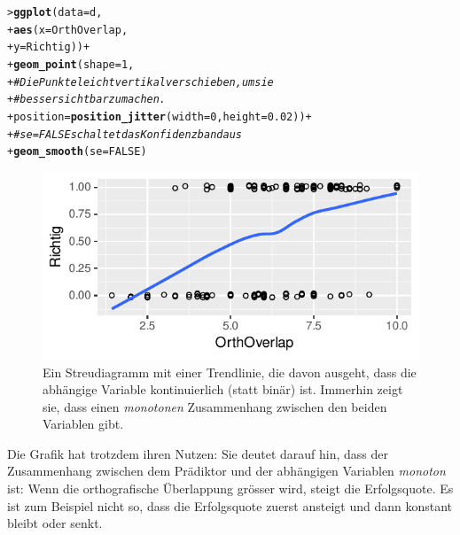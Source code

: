 \documentclass[oneside, 10pt]{book}\usepackage[]{graphicx}\usepackage[]{xcolor}
\makeatletter
\newcommand{\hlnum}[1]{\textcolor[rgb]{0.686,0.059,0.569}{#1}}%
\newcommand{\hlcom}[1]{\textcolor[rgb]{0.678,0.584,0.686}{\textit{#1}}}%
\newcommand{\hlopt}[1]{\textcolor[rgb]{0,0,0}{#1}}%
\newcommand{\hlstd}[1]{\textcolor[rgb]{0.345,0.345,0.345}{#1}}%
\newcommand{\hlkwc}[1]{\textcolor[rgb]{0.333,0.667,0.333}{#1}}%
\newcommand{\hlkwd}[1]{\textcolor[rgb]{0.737,0.353,0.396}{\textbf{#1}}}%
\newenvironment{kframe}{%
 \def\at@end@of@kframe{}%
 \ifinner\ifhmode%
  \def\at@end@of@kframe{\end{minipage}}%
  \begin{minipage}{\columnwidth}%
 \fi\fi%
 \def\FrameCommand##1{\hskip\@totalleftmargin \hskip-\fboxsep
 \colorbox{shadecolor}{##1}\hskip-\fboxsep
     \hskip-\linewidth \hskip-\@totalleftmargin \hskip\columnwidth}%
 \MakeFramed {\advance\hsize-\width
   \@totalleftmargin\z@ \linewidth\hsize
   \@setminipage}}%
 {\par\unskip\endMakeFramed%
 \at@end@of@kframe}
\newenvironment{knitrout}{}{} %
\makeatother
\begin{document}
\begin{knitrout}
\color{fgcolor}\begin{kframe}
\begin{alltt}
\hlstd{> }\hlkwd{ggplot}\hlstd{(}\hlkwc{data} \hlstd{= d,}
\hlstd{+ }       \hlkwd{aes}\hlstd{(}\hlkwc{x} \hlstd{= OrthOverlap,}
\hlstd{+ }           \hlkwc{y} \hlstd{= Richtig))} \hlopt{+}
\hlstd{+ }  \hlkwd{geom_point}\hlstd{(}\hlkwc{shape} \hlstd{=} \hlnum{1}\hlstd{,}
\hlstd{+ }             \hlcom{# Die Punkte leicht vertikal verschieben, um sie}
\hlstd{+ }             \hlcom{# besser sichtbar zu machen.}
\hlstd{+ }             \hlkwc{position} \hlstd{=} \hlkwd{position_jitter}\hlstd{(}\hlkwc{width} \hlstd{=} \hlnum{0}\hlstd{,} \hlkwc{height} \hlstd{=} \hlnum{0.02}\hlstd{))} \hlopt{+}
\hlstd{+ }  \hlcom{# se = FALSE schaltet das Konfidenzband aus}
\hlstd{+ }  \hlkwd{geom_smooth}\hlstd{(}\hlkwc{se} \hlstd{=} \hlnum{FALSE}\hlstd{)}
\end{alltt}
\end{kframe}\begin{figure}[tp]

{\centering \includegraphics[width=.5\textwidth]{figs/unnamed-chunk-459-1} 

}

\caption{Ein Streudiagramm mit einer Trendlinie, die davon ausgeht, dass die abhängige Variable kontinuierlich (statt binär) ist. Immerhin zeigt sie, dass einen \emph{monotonen} Zusammenhang zwischen den beiden Variablen gibt.\label{fig:continuouslogistic}}\label{fig:unnamed-chunk-459}
\end{figure}

\end{knitrout}

Die Grafik hat trotzdem ihren Nutzen:
Sie deutet darauf hin, dass der Zusammenhang zwischen
dem Prädiktor und der abhängigen Variablen \emph{monoton} ist:
Wenn die orthografische Überlappung grösser wird, steigt
die Erfolgsquote. Es ist zum Beispiel nicht so, dass
die Erfolgsquote zuerst ansteigt und dann konstant bleibt oder senkt.
\end{document}
